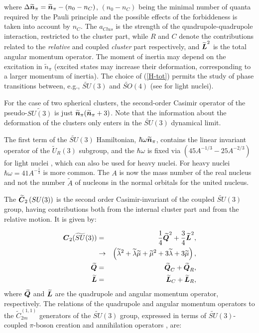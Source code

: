 \documentclass[12pt]{article}
\newcommand{\bd}[1]{ \mbox{\boldmath $#1$}}
\begin{document}
where $\Delta \widetilde{{\bd n}}_\pi = \widetilde{{\bd n}}_\pi - (n_0-n_C)$, $(n_0-n_C)$
being the minimal number of quanta required by the Pauli principle
and the possible effects of the forbiddeness is taken into account by $n_C$.
The $a_{Clus}$ is the strength of the quadrupole-quadrupole
interaction, restricted to the cluster part, while $R$ and $C$
denote the contributions related to the {\it relative} and
coupled {\it cluster} part respectively, and
$\widetilde{{\bd L}}^2$ is the total angular momentum operator. 
The moment of inertia may depend on the excitation in $\tilde{n}_\pi$ 
(excited states may increase their deformation, corresponding to a larger momentum
of inertia).
The choice of (\ref{H-tot}) permits the study of phase 
transitions between, e.g., $\widetilde{SU}(3)$ and
$\widetilde{SO}(4)$ (see \cite{phase-I,phase-II} for light
nuclei).

For the case of two spherical
clusters, the second-order Casimir operator of  the pseudo-$\widetilde{SU(3)}$  is just 
$\widetilde{{\bd n}}_\pi ( \widetilde{{\bd n}}_\pi + 3)$.  Note that the information about 
the deformation of the
clusters only
enters in the $\widetilde{SU}(3)$ dynamical limit.

The first term of the $\widetilde{SU}(3)$ Hamiltonian, $\hbar\omega \mbox{\boldmath
$\widetilde{n}$}_\pi$, contains the linear invariant operator of the  $\widetilde{U}_R(3)$    
subgroup, and the $\hbar\omega$ is fixed via $(45 A^{-1/3}
- 25 A^{-2/3})$ for
light nuclei \cite{hw}, which can also be used for heavy nuclei.
For heavy nuclei $\hbar\omega = 41 A^{-\frac{1}{3}}$ is more common. The $A$ is now the mass number of the real nucleus
and not the number ${\tilde A}$ of nucleons in the normal
orbitals for the united nucleus.

The $\mbox{\boldmath $\widetilde{C}$}_2\left(SU(3)\right)$ %
is the second order Casimir-invariant of the coupled
$\widetilde{SU}(3)$ group, having contributions both from the internal
cluster part and from the relative motion. It is given by:

\begin{eqnarray}
\mbox{\boldmath $C$}_2(\widetilde{SU}(3)) & = & \frac{1}{4} \mbox{\boldmath $\widetilde{Q}$}^2 +
\frac{3}{4} \mbox{\boldmath $\widetilde{L}$}^2 ,  \nonumber \\
& \rightarrow & \left(\widetilde{\lambda}^2 + \widetilde{\lambda}\widetilde{\mu} 
+ \widetilde{\mu}^2 + 3\widetilde{\lambda} + 3\widetilde{\mu}
\right) ,  \nonumber \\
\mbox{\boldmath $\widetilde{Q}$} & = & \mbox{\boldmath $\widetilde{Q}$}_C 
+ \mbox{\boldmath $\widetilde{Q}$}_R ,
\nonumber \\
\mbox{\boldmath $\widetilde{L}$} & = & \mbox{\boldmath $\widetilde{L}$}_C 
+ \mbox{\boldmath $\widetilde{L}$}_R ,
\label{su3}
\end{eqnarray}
where $\mbox{\boldmath $\widetilde{Q}$}$ and $\mbox{\boldmath $\widetilde{L}$}$ are
the quadrupole and angular momentum operator,
respectively. The relations of the quadrupole and angular momentum
operators to the $\widetilde{C}^{(1,1)}_{2m}$ generators of the $\widetilde{SU}(3)$ 
group, expressed in terms of $\widetilde{SU}(3)$-coupled $\pi$-boson creation and
annihilation operators \cite{escher}, are:
\end{document}
